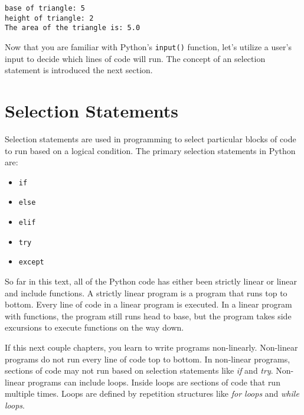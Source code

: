 \documentclass{book}
\providecommand{\tightlist}{%
      \setlength{\itemsep}{0pt}\setlength{\parskip}{0pt}}
\newcommand{\passthrough}[1]{#1}
\begin{document}
    \begin{Verbatim}[commandchars=\\\{\}]
base of triangle: 5
height of triangle: 2
The area of the triangle is: 5.0

    \end{Verbatim}


    
        Now that you are familiar with Python's
\passthrough{\lstinline!input()!} function, let's utilize a user's input
to decide which lines of code will run. The concept of an selection
statement is introduced the next section.
    




    
        \hypertarget{selection-statements}{%
\section{Selection Statements}\label{selection-statements}}
    




    
        Selection statements are used in programming to select particular blocks
of code to run based on a logical condition. The primary selection
statements in Python are:

\begin{itemize}
\tightlist
\item
  \passthrough{\lstinline!if!}
\item
  \passthrough{\lstinline!else!}
\item
  \passthrough{\lstinline!elif!}
\item
  \passthrough{\lstinline!try!}
\item
  \passthrough{\lstinline!except!}
\end{itemize}
    




    
        So far in this text, all of the Python code has either been strictly
linear or linear and include functions. A strictly linear program is a
program that runs top to bottom. Every line of code in a linear program
is executed. In a linear program with functions, the program still runs
head to base, but the program takes side excursions to execute functions
on the way down.

If this next couple chapters, you learn to write programs non-linearly.
Non-linear programs do not run every line of code top to bottom. In
non-linear programs, sections of code may not run based on selection
statements like \emph{if} and \emph{try}. Non-linear programs can
include loops. Inside loops are sections of code that run multiple
times. Loops are defined by repetition structures like \emph{for loops}
and \emph{while loops}.
\end{document}
